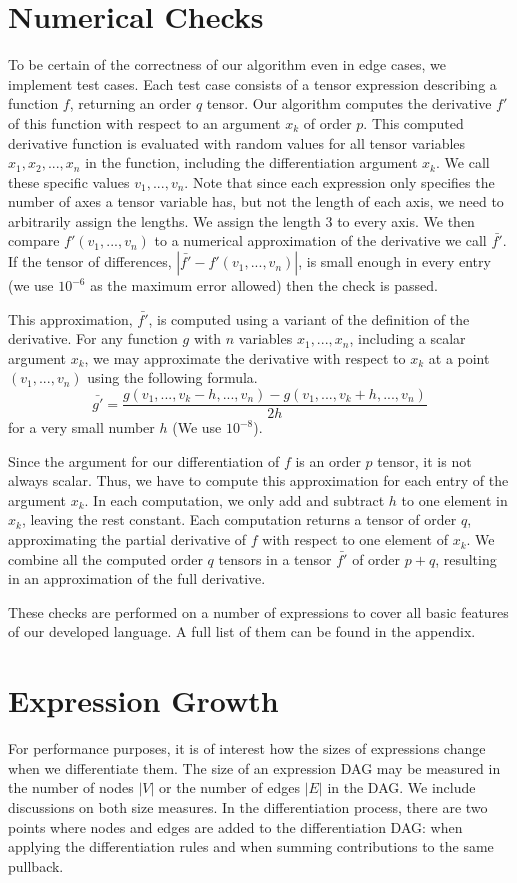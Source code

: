 \documentclass[12pt, a4paper]{report} %
\begin{document}
\section{Numerical Checks}
To be certain of the correctness of our algorithm even in edge cases, we implement test cases.
Each test case consists of a tensor expression describing a function $f$, returning an order $q$ tensor. 
Our algorithm computes the derivative $f'$ of this function with respect to an argument $x_k$ of order $p$.
This computed derivative function is evaluated with random values for all tensor variables $x_1, x_2, ..., x_n$ in the function, including the differentiation argument $x_k$.
We call these specific values $v_1, ..., v_n$.
Note that since each expression only specifies the number of axes a tensor variable has, but not the length of each axis, we need to arbitrarily assign the lengths.
We assign the length $3$ to every axis.
We then compare $f'(v_1,..., v_n)$ to a numerical approximation of the derivative we call $\bar{f'}$.
If the tensor of differences, $|\bar{f'} - f'(v_1,..., v_n)|$, is small enough in every entry (we use $10^{-6}$ as the maximum error allowed) then the check is passed.

This approximation, $\bar{f'}$, is computed using a variant of the definition of the derivative.
For any function $g$ with $n$ variables $x_1, ..., x_n$, including a scalar argument $x_k$, we may approximate the derivative with respect to $x_k$ at a point $(v_1, ..., v_n)$ using the following formula.
$$\bar{g'} = \frac{g(v_1,..., v_k-h,..., v_n) - g(v_1,..., v_k+h,..., v_n)}{2h}$$ 
for a very small number $h$ (We use $10^{-8}$).

Since the argument for our differentiation of $f$ is an order $p$ tensor, it is not always scalar.
Thus, we have to compute this approximation for each entry of the argument $x_k$.
In each computation, we only add and subtract $h$ to one element in $x_k$, leaving the rest constant.
Each computation returns a tensor of order $q$, approximating the partial derivative of $f$ with respect to one element of $x_k$.
We combine all the computed order $q$ tensors in a tensor $\bar{f'}$ of order $p+q$, resulting in an approximation of the full derivative.

These checks are performed on a number of expressions to cover all basic features of our developed language.
A full list of them can be found in the appendix.

\section{Expression Growth}
For performance purposes, it is of interest how the sizes of expressions change when we differentiate them.
The size of an expression DAG may be measured in the number of nodes $|V|$ or the number of edges $|E|$ in the DAG.
We include discussions on both size measures.
In the differentiation process, there are two points where nodes and edges are added to the differentiation DAG: when applying the differentiation rules and when summing contributions to the same pullback.
\end{document}
